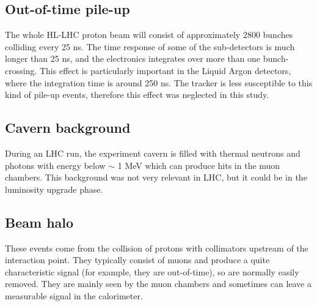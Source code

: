 \documentclass[a4paper,twoside,12pt]{book}
\begin{document}

\subsection*{Out-of-time pile-up}
The whole HL-LHC proton beam will consist of approximately 2800 bunches colliding every 25 ns. The time response of some of the 
sub-detectors is much longer than 25 ns, and the electronics integrates over more than one
bunch-crossing. This effect is particularly important in the Liquid Argon detectors, where
the integration time is around 250 ns\cite{ATLAS_pileup}. The tracker is less susceptible to this kind of 
pile-up events, therefore this effect was neglected in this study.

\subsection*{Cavern background}
During an LHC run, the experiment cavern is filled with thermal neutrons and photons with 
energy below $\sim$ 1 MeV which can produce hits in the muon chambers. This background
was not very relevant in LHC, but it could be in the luminosity upgrade phase\cite{ATLAS_pileup}.

\subsection*{Beam halo}
These events come from the collision of protons with collimators upstream of the 
interaction point. They typically consist of muons and produce a quite characteristic signal (for example, they are out-of-time), so are normally easily removed. They are mainly seen by the muon chambers and sometimes
can leave a measurable signal in the calorimeter\cite{ATLAS_pileup}. 
\end{document}
